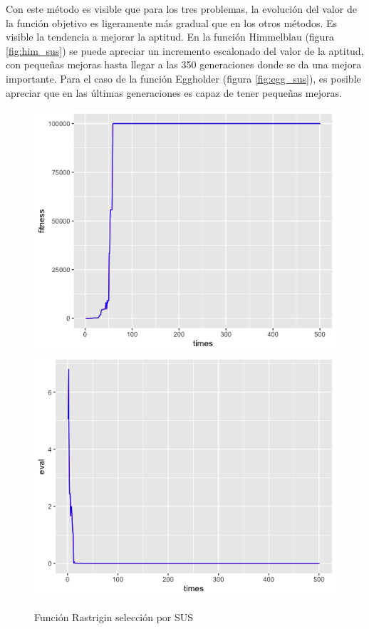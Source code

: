 \documentclass[letterpaper,12pt]{article}
\theoremstyle{definition}
\begin{document}
Con este método es visible que para los tres problemas, la evolución del valor de la función objetivo es ligeramente más gradual que en los otros métodos. Es visible la tendencia a mejorar la aptitud. En la función Himmelblau (figura \ref{fig:him_sus}) se puede apreciar un incremento escalonado del valor de la aptitud, con pequeñas mejoras hasta llegar a las 350 generaciones donde se da una mejora importante. Para el caso de la función Eggholder (figura \ref{fig:egg_sus}), es posible apreciar que en las últimas generaciones es capaz de tener pequeñas mejoras.

\begin{figure}[H]
    \includegraphics[width=\linewidth]{rast_elite_sus_fitness_new}
  \endminipage\hfill
    \includegraphics[width=\linewidth]{rast_elite_sus_eval_new}
  \endminipage\hfill
  \caption{Función Rastrigin selección por SUS}
  \label{fig:rast_sus}
\end{figure}
\end{document}
